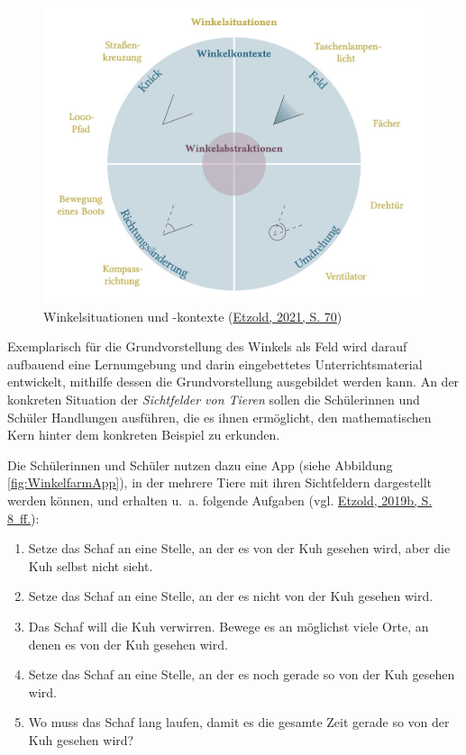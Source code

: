 \documentclass[
  ngerman,
]{scrbook}
\providecommand{\tightlist}{%
  \setlength{\itemsep}{0pt}\setlength{\parskip}{0pt}}
\theoremstyle{definition}
\theoremstyle{definition}
\theoremstyle{definition}
\theoremstyle{definition}
\theoremstyle{remark}
\begin{document}
\begin{figure}

{\centering \includegraphics[width=0.75\linewidth]{pictures/2-Winkelsituationen} 

}

\caption{Winkelsituationen und -kontexte (\protect\hyperlink{ref-Etzold2021}{Etzold, 2021, S. 70})}\label{fig:Winkelsituationen}
\end{figure}

Exemplarisch für die Grundvorstellung des Winkels als Feld wird darauf aufbauend eine Lernumgebung und darin eingebettetes Unterrichtsmaterial entwickelt, mithilfe dessen die Grundvorstellung ausgebildet werden kann. An der konkreten Situation der \emph{Sichtfelder von Tieren} sollen die Schülerinnen und Schüler Handlungen ausführen, die es ihnen ermöglicht, den mathematischen Kern hinter dem konkreten Beispiel zu erkunden.

Die Schülerinnen und Schüler nutzen dazu eine App (siehe Abbildung \ref{fig:WinkelfarmApp}), in der mehrere Tiere mit ihren Sichtfeldern dargestellt werden können, und erhalten u.~a. folgende Aufgaben (vgl. \protect\hyperlink{ref-Etzold:2019Praxis4}{Etzold, 2019b, S. 8~ff.}):

\begin{enumerate}
\def\labelenumi{\arabic{enumi}.}
\tightlist
\item
  Setze das Schaf an eine Stelle, an der es von der Kuh gesehen wird, aber die Kuh selbst nicht sieht.
\item
  Setze das Schaf an eine Stelle, an der es nicht von der Kuh gesehen wird.
\item
  Das Schaf will die Kuh verwirren. Bewege es an möglichst viele Orte, an denen es von der Kuh gesehen wird.
\item
  Setze das Schaf an eine Stelle, an der es noch gerade so von der Kuh gesehen wird.
\item
  Wo muss das Schaf lang laufen, damit es die gesamte Zeit gerade so von der Kuh gesehen wird?
\end{enumerate}
\end{document}
